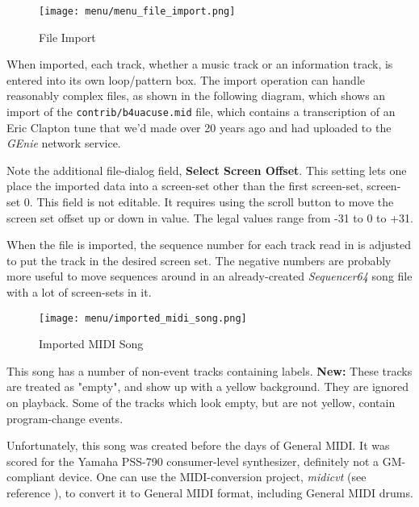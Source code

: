 \begin{figure}[H]
   \centering 
   \texttt{[image: menu/menu\_file\_import.png]}
   \caption{File Import}
   \label{fig:seq64_menu_file_import}
\end{figure}

   When imported, each track, whether a music track or an information track,
   is entered into its own loop/pattern box.  The import operation can
   handle reasonably complex files, as shown in the following diagram, which
   shows an import of the \texttt{contrib/b4uacuse.mid} file, which contains
   a transcription of an Eric Clapton tune that we'd made over 20 
   years ago and had uploaded to the \textsl{GEnie} network service.

   Note the additional file-dialog field,
   \textbf{Select Screen Offset}.
   This setting lets one place the imported data into a screen-set other than
   the first screen-set, screen-set 0.
   This field is not editable.  It requires using the scroll button to move the
   screen set offset up or down in value.  The legal values range from -31 to 0
   to +31.
   
   When the file is imported, the sequence number for each track read in is
   adjusted to put the track in the desired screen set.  The negative numbers
   are probably more useful to move sequences around in an already-created
   \textsl{Sequencer64} song file with a lot of screen-sets in it.

\begin{figure}[H]
   \centering 
   \texttt{[image: menu/imported\_midi\_song.png]}
   \caption{Imported MIDI Song}
   \label{fig:seq64_imported_midi_song}
\end{figure}

   This song has a number of non-event tracks containing labels.
   \textbf{New:}
   These tracks are treated as "empty", and show up with a yellow
   background.  They are ignored on playback.   Some of the tracks
   which look empty, but are not yellow, contain program-change events.

   Unfortunately, this song was created before the days of General MIDI.
   It was scored for the Yamaha PSS-790 consumer-level synthesizer,
   definitely not a GM-compliant device.
   One can use the MIDI-conversion project, \textsl{midicvt}
   (see reference \cite{midicvt}),
   to convert it to General MIDI format, including General MIDI drums.

